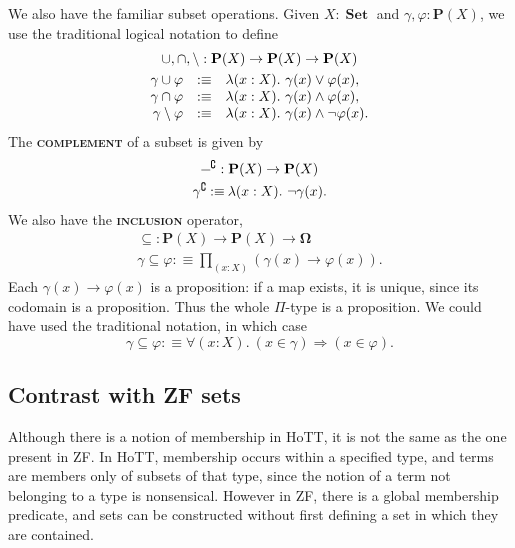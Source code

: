 \documentclass{article}
\newcommand{\defn}[1]{{\scshape\bfseries\color{MPBemph}#1}}
\newcommand{\eql}{\mathbin{:\equiv}}
\newcommand{\tpi}[1]{\prod_{(#1)}}
\newcommand{\1}{\textbf{1}}
\newcommand{\0}{\mathbf{0}}
\newcommand{\2}{\textbf{2}}
\newcommand{\dash}{\rule[0.5ex]{1.5ex}{0.4pt}}
\DeclareMathOperator{\Set}{\textbf{Set}}
\newcommand{\PropO}{\mathbf{\Omega}}
\renewcommand{\P}{\textbf{P}}
\begin{document}
We also have the familiar subset operations. Given \( X : \Set \) and \( \gamma, \varphi : \P(X) \), we use the traditional logical notation to define
\[ \begin{array}{rcl}
	\multicolumn{3}{c}{\makebox[0pt]{\( \cup, \cap, {\setminus} : \P(X) \to \P(X) \to \P(X) \)}} \\[3pt]
	\gamma \cup \varphi &\eql& \lambda(x : X).~ \gamma(x) \vee \varphi(x), \\
	\gamma \cap \varphi &\eql& \lambda(x : X).~ \gamma(x) \wedge \varphi(x), \\
	\gamma \setminus \varphi &\eql& \lambda(x : X).~ \gamma(x) \wedge \neg\varphi(x).
\end{array} \]
The \defn{complement} of a subset is given by
\[ \begin{array}{c}
	\dash^{\complement} : \P(X) \to \P(X) \\[3pt]
	\gamma^{\complement} \eql \lambda(x : X).~ \neg\gamma(x).
\end{array} \]
We also have the \defn{inclusion} operator,
\[ \begin{array}{c}
	{\subseteq} : \P(X) \to \P(X) \to \PropO \\[3pt]
	\gamma \subseteq \varphi \eql \tpi{x : X} (\gamma(x) \to \varphi(x)).
\end{array} \]
Each \( \gamma(x) \to \varphi(x) \) is a proposition: if a map exists, it is unique, since its codomain is a proposition. Thus the whole \( \Pi \)-type is a proposition. We could have used the traditional notation, in which case
\[ \gamma \subseteq \varphi \eql \forall(x : X).~(x \in \gamma) \Rightarrow (x \in \varphi). \]
\subsection{Contrast with ZF sets}
Although there is a notion of membership in HoTT, it is not the same as the one present in ZF. In HoTT, membership occurs within a specified type, and terms are members only of subsets of that type, since the notion of a term not belonging to a type is nonsensical. However in ZF, there is a global membership predicate, and sets can be constructed without first defining a set in which they are contained.
\end{document}
